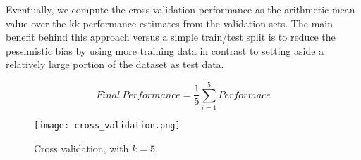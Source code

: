 Eventually, we compute the cross-validation performance as the arithmetic mean value over the kk performance estimates from the validation sets. The main benefit behind this approach versus a simple train/test split is to reduce the pessimistic bias by using more training data in contrast to setting aside a relatively large portion of the dataset as test data.

\begin{equation}
Final \ Performance = \frac{1}{5}\sum_{i=1}^{5}Performace
\end{equation}
\begin{figure}
	\centering
	\texttt{[image: cross\_validation.png]}
	\caption{Cross validation, with \(k=5\).}
	\label{fig:Cross_validation}
\end{figure}
